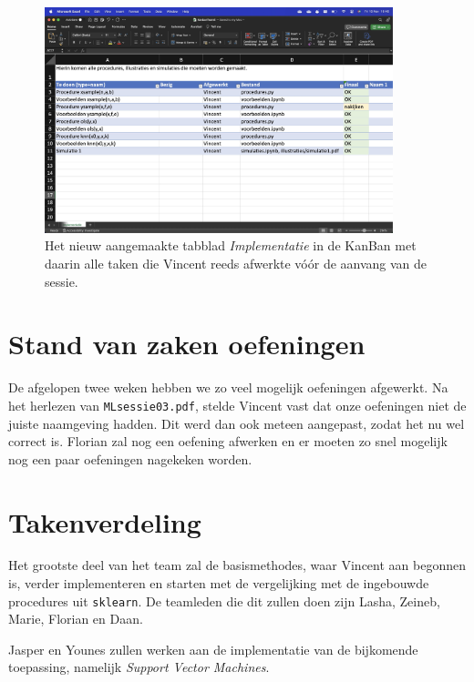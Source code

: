 \documentclass{article}
\begin{document}
	\begin{figure}
		\centering
		\includegraphics[width=0.9\textwidth]{kanban}
		\caption{Het nieuw aangemaakte tabblad \textit{Implementatie} in de KanBan met daarin alle taken die Vincent reeds afwerkte vóór de aanvang van de sessie.}
		\label{fig:kanban}
	\end{figure}
	
	\section*{Stand van zaken oefeningen}

	De afgelopen twee weken hebben we zo veel mogelijk oefeningen afgewerkt. Na het herlezen van \texttt{MLsessie03.pdf}, stelde Vincent vast dat onze oefeningen niet de juiste naamgeving hadden. Dit werd dan ook meteen aangepast, zodat het nu wel correct is. Florian zal nog een oefening afwerken en er moeten zo snel mogelijk nog een paar oefeningen nagekeken worden.
	
	\section*{Takenverdeling}
	
	Het grootste deel van het team zal de basismethodes, waar Vincent aan begonnen is, verder implementeren en starten met de vergelijking met de ingebouwde procedures uit \texttt{sklearn}. De teamleden die dit zullen doen zijn Lasha, Zeineb, Marie, Florian en Daan.
	
	Jasper en Younes zullen werken aan de implementatie van de bijkomende toepassing, namelijk \textit{Support Vector Machines}.
	
\end{document}
